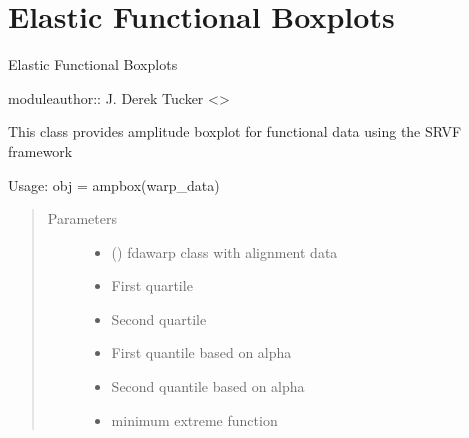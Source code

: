 \documentclass[letterpaper,10pt,english]{sphinxmanual}
\begin{document}
\chapter{Elastic Functional Boxplots}
\label{\detokenize{boxplots:module-boxplots}}\label{\detokenize{boxplots:elastic-functional-boxplots}}\label{\detokenize{boxplots::doc}}
Elastic Functional Boxplots

moduleauthor:: J. Derek Tucker \textless{}\textgreater{}

\begin{fulllineitems}
\label{\detokenize{boxplots:boxplots.ampbox}}
This class provides amplitude boxplot for functional data using the
SRVF framework

Usage:  obj = ampbox(warp\_data)
\begin{quote}\begin{description}
\item[{Parameters}] \leavevmode\begin{itemize}
\item {} 
 ({\hyperref[\detokenize{time_warping:time_warping.fdawarp}]{}}) \textendash{} fdawarp class with alignment data

\item {} 
 \textendash{} First quartile

\item {} 
 \textendash{} Second quartile

\item {} 
 \textendash{} First quantile based on alpha

\item {} 
 \textendash{} Second quantile based on alpha

\item {} 
 \textendash{} minimum extreme function


\end{itemize}
\end{description}
\end{quote}
\end{fulllineitems}
\end{document}
